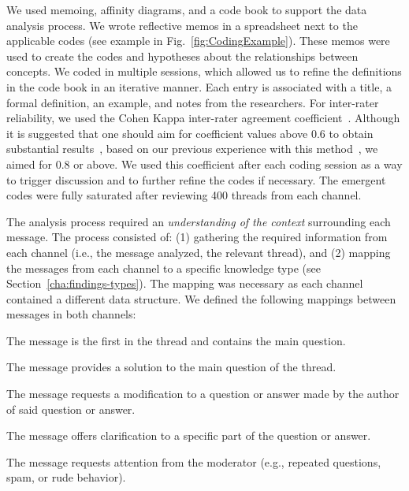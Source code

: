 \documentclass[smallextended]{svjour3}       %
\begin{document}
We used memoing, affinity diagrams, and a code book to support the data analysis process. We wrote reflective memos in a spreadsheet next to the applicable codes (see example in Fig.~\ref{fig:CodingExample}). These memos were used to create the codes and hypotheses about the relationships between concepts. We coded in multiple sessions, which allowed us to refine the definitions in the code book 
in an iterative manner. Each entry is associated with a title, a formal definition, an example, and notes from the researchers. For inter-rater reliability, we used the Cohen Kappa inter-rater agreement coefficient~\cite{Stemler2004}. Although it is suggested that one should aim for coefficient values above 0.6 to obtain substantial results~\cite{Landis1977}, based on our previous experience with this method~\cite{Gomez2013}, we aimed for 0.8 or above. We used this coefficient after each coding session as a way to trigger discussion and to further refine the codes if necessary.  
The emergent codes were fully saturated after reviewing 400 threads from each channel.


The analysis process required an \textit{understanding of the context} surrounding each message. The process consisted of: (1) gathering the required information from each channel (i.e., the message analyzed, the relevant thread), and (2) mapping the messages from each channel to a specific knowledge type (see Section~\ref{cha:findings-types}). The mapping was necessary as each channel contained a different data structure.
We defined the following mappings between messages in both channels:

	\begin{description}[itemsep=1pt, topsep=2pt, leftmargin=1em, parsep=0pt]
		\item[\textbf{Question:}] The message is the first in the thread and contains the main question.
		\item[\textbf{Answer:}] The message provides a solution to the main question of the thread.
	 	\item[\textbf{Update:}] The message requests a modification to a question or answer made by the author of said question or answer.
		\item[\textbf{Comment:}] The message offers clarification to a specific part of the question or answer.
		\item[\textbf{Flag:}] The message requests attention from the moderator (e.g., repeated questions, spam, or rude behavior).
	\end{description}
\end{document}
